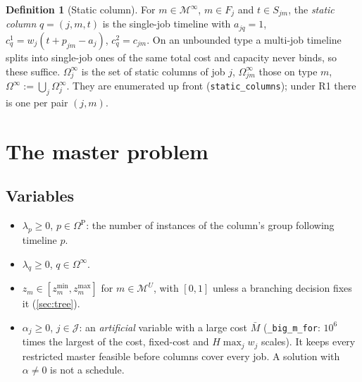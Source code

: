 \documentclass[11pt,a4paper]{article}
\theoremstyle{definition}
\newtheorem{definition}[theorem]{Definition}
\theoremstyle{remark}
\newcommand{\J}{\mathcal{J}}
\newcommand{\M}{\mathcal{M}}
\newcommand{\Minf}{\M^{\infty}}
\newcommand{\MU}{\M^{U}}
\newcommand{\Om}{\Omega}
\newcommand{\code}[1]{\texttt{#1}}
\begin{document}
\begin{definition}[Static column]
For $m\in\Minf$, $m\in F_j$ and $t\in S_{jm}$, the \emph{static column}
$q=(j,m,t)$ is the single-job timeline with $a_{jq}=1$,
$c^1_q=w_j(t+p_{jm}-a_j)$, $c^2_q=c_{jm}$. On an unbounded type a multi-job
timeline splits into single-job ones of the same total cost and capacity never
binds, so these suffice. $\Om^\infty_j$ is the set of static columns of job
$j$, $\Om^\infty_{jm}$ those on type $m$, $\Om^\infty:=\bigcup_j\Om^\infty_j$.
They are enumerated up front (\code{static\_columns}); under R1 there is one
per pair $(j,m)$.
\end{definition}

\section{The master problem}\label{sec:master}

\subsection{Variables}
\begin{itemize}[nosep]
\item $\lambda_p\ge0$, $p\in\Om^{\mathrm P}$: the number of instances of the
  column's group following timeline $p$.
\item $\lambda_q\ge0$, $q\in\Om^\infty$.
\item $z_m\in[z^{\min}_m,z^{\max}_m]$ for $m\in\MU$, with $[0,1]$ unless a
  branching decision fixes it (\cref{sec:tree}).
\item $\alpha_j\ge0$, $j\in\J$: an \emph{artificial} variable with a large
  cost $\bar M$ (\code{\_big\_m\_for}: $10^6$ times the largest of the cost,
  fixed-cost and $H\max_jw_j$ scales). It keeps every restricted master
  feasible before columns cover every job. A solution with $\alpha\ne0$ is not
  a schedule.
\end{itemize}
\end{document}

